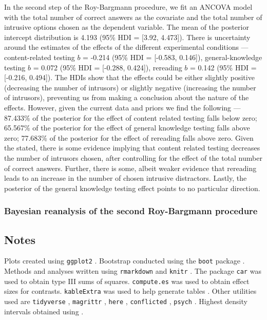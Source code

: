 \documentclass[11pt,]{article}
\begin{document}
In the second step of the Roy-Bargmann procedure, we fit an ANCOVA model
with the total number of correct answers as the covariate and the total
number of intrusive options chosen as the dependent variable. The mean
of the posterior intercept distribution is 4.193 (95\% HDI = {[}3.92,
4.473{]}). There is uncertainty around the estimates of the effects of
the different experimental conditions --- content-related testing \(b\)
= -0.214 (95\% HDI = {[}-0.583, 0.146{]}), general-knowledge testing
\(b\) = 0.072 (95\% HDI = {[}-0.288, 0.424{]}), rereading \(b\) = 0.142
(95\% HDI = {[}-0.216, 0.494{]}). The HDIs show that the effects could
be either slightly positive (decreasing the number of intrusors) or
slightly negative (increasing the number of intrusors), preventing us
from making a conclusion about the nature of the effects. However, given
the current data and priors we find the following --- 87.433\% of the
posterior for the effect of content related testing falls below zero;
65.567\% of the posterior for the effect of general knowledge testing
falls above zero; 77.683\% of the posterior for the effect of rereading
falls above zero. Given the stated, there is some evidence implying that
content related testing decreases the number of intrusors chosen, after
controlling for the effect of the total number of correct answers.
Further, there is some, albeit weaker evidence that rereading leads to
an increase in the number of chosen intrusive distractors. Lastly, the
posterior of the general knowledge testing effect points to no
particular direction.

\hypertarget{bayesian-reanalysis-of-the-second-roy-bargmann-procedure}{%
\subsubsection{Bayesian reanalysis of the second Roy-Bargmann
procedure}\label{bayesian-reanalysis-of-the-second-roy-bargmann-procedure}}

\hypertarget{notes}{%
\subsection{Notes}\label{notes}}

Plots created using \texttt{ggplot2}
\citep{wickhamGgplot2ElegantGraphics2016}. Bootstrap conducted using the
\texttt{boot} package \citep{cantyBootBootstrapSPlus2017}. Methods and
analyses written using \texttt{rmarkdown}
\citep{allaireRmarkdownDynamicDocuments2019} and \texttt{knitr}
\citep{xieKnitrGeneralPurposePackage2019}. The package \texttt{car}
\citep{foxCompanionAppliedRegression2011} was used to obtain type III
sums of squares. \texttt{compute.es} \citep{reComputeEsCompute2013} was
used to obtain effect sizes for contrasts. \texttt{kableExtra} was used
to help generate tables \citep{zhuKableExtraConstructComplex2019}. Other
utilities used are \texttt{tidyverse}
\citep{wickhamTidyverseEasilyInstall2017}, \texttt{magrittr}
\citep{bacheMagrittrForwardPipeOperator2014}, \texttt{here}
\citep{mullerHereSimplerWay2017}, \texttt{conflicted}
\citep{wickhamConflictedAlternativeConflict2018}, \texttt{psych}
\citep{revellePsychProceduresPsychological2018}. Highest density
intervals obtained using \citep{meredithHDIntervalHighestPosterior2018}.
\end{document}

